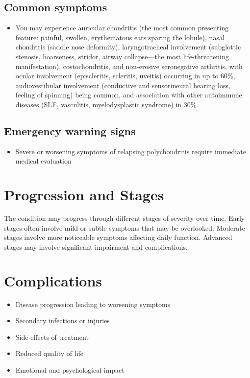 \subsection{Common symptoms}
\begin{itemize}[noitemsep]
  \item You may experience auricular chondritis (the most common presenting feature: painful, swollen, erythematous ears sparing the lobule), nasal chondritis (saddle nose deformity), laryngotracheal involvement (subglottic stenosis, hoarseness, stridor, airway collapse---the most life-threatening manifestation), costochondritis, and non-erosive seronegative arthritis, with ocular involvement (episcleritis, scleritis, uveitis) occurring in up to 60\%, audiovestibular involvement (conductive and sensorineural hearing loss, feeling of spinning) being common, and association with other autoimmune diseases (SLE, vasculitis, myelodysplastic syndrome) in 30\%. 
  \end{itemize}

\subsection{Emergency warning signs}
\begin{itemize}[noitemsep]
  \item Severe or worsening symptoms of relapsing polychondritis require immediate medical evaluation
\end{itemize}
\section{Progression and Stages}
The condition may progress through different stages of severity over time. Early stages often involve mild or subtle symptoms that may be overlooked. Moderate stages involve more noticeable symptoms affecting daily function. Advanced stages may involve significant impairment and complications.
\section{Complications}
\begin{itemize}[noitemsep]
  \item Disease progression leading to worsening symptoms
  \item Secondary infections or injuries
  \item Side effects of treatment
  \item Reduced quality of life
  \item Emotional and psychological impact
\end{itemize}
